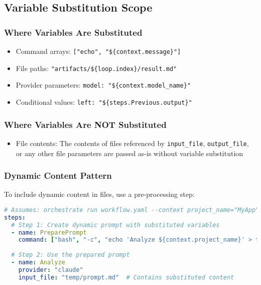 \documentclass[11pt,a4paper]{article}
\begin{document}
\subsection{Variable Substitution Scope}

\subsubsection{Where Variables Are Substituted}
\begin{itemize}
    \item Command arrays: \texttt{["echo", "\$\{context.message\}"]}
    \item File paths: \texttt{"artifacts/\$\{loop.index\}/result.md"}
    \item Provider parameters: \texttt{model: "\$\{context.model\_name\}"}
    \item Conditional values: \texttt{left: "\$\{steps.Previous.output\}"}
\end{itemize}

\subsubsection{Where Variables Are NOT Substituted}
\begin{itemize}
    \item File contents: The contents of files referenced by \texttt{input\_file}, \texttt{output\_file}, or any other file parameters are passed as-is without variable substitution
\end{itemize}

\subsubsection{Dynamic Content Pattern}

To include dynamic content in files, use a pre-processing step:

\begin{lstlisting}[language=yaml, caption={Dynamic Content Pattern}]
# Assumes: orchestrate run workflow.yaml --context project_name="MyApp"
steps:
  # Step 1: Create dynamic prompt with substituted variables
  - name: PreparePrompt
    command: ["bash", "-c", "echo 'Analyze ${context.project_name}' > temp/prompt.md"]
    
  # Step 2: Use the prepared prompt
  - name: Analyze
    provider: "claude"
    input_file: "temp/prompt.md"  # Contains substituted content
\end{lstlisting}
\end{document}
